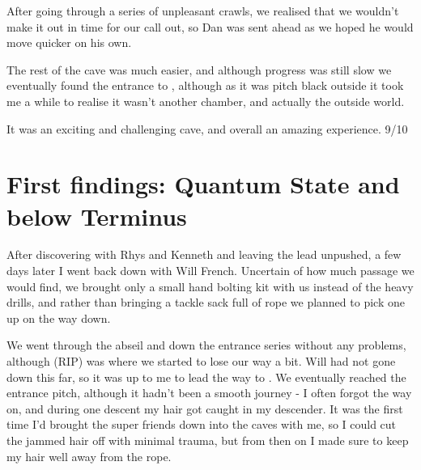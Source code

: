 After going through a series of unpleasant crawls, we realised that we wouldn't make it out in time for our call out, so Dan was sent ahead as we hoped he would move quicker on his own.

The rest of the cave was much easier, and although progress was still slow we eventually found the entrance to , although as it was pitch black outside it took me a while to realise it wasn't another chamber, and actually the outside world. 

It was an exciting and challenging cave, and overall an amazing experience. 9/10

\section{First findings: Quantum State and below Terminus}
After discovering  with Rhys and Kenneth and leaving the lead unpushed, a few days later I went back down with Will French. 
Uncertain of how much passage we would find, we brought only a small hand bolting kit with us instead of the heavy drills, and rather than bringing a tackle sack full of rope we planned to pick one up on the way down. 

We went through the abseil and down the entrance series without any problems, although  (RIP) was where we started to lose our way a bit. Will had not gone down this far, so it was up to me to lead the way to . We eventually reached the  entrance pitch, although it hadn't been a smooth journey - I often forgot the way on, and during one descent my hair got caught in my descender. It was the first time I'd brought the super friends down into the caves with me, so I could cut the jammed hair off with minimal trauma, but from then on I made sure to keep my hair well away from the rope.


